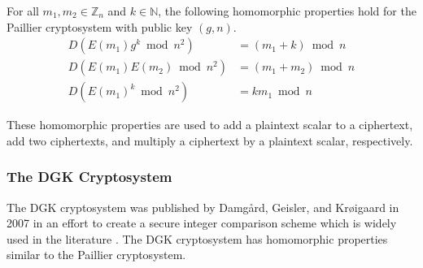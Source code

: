 For all $m_1,m_2 \in \mathbb{Z}_n$ and $k\in \mathbb{N}$, the following homomorphic properties hold for the Paillier cryptosystem with public key $(g,n)$.
\begin{align*}
  D(E(m_1)g^k\bmod n^2) &=(m_1+k)\bmod n\\
  D(E(m_1)E(m_2)\bmod n^2) &=(m_1+m_2)\bmod n\\
  D(E(m_1)^k\bmod n^2) &= km_1\bmod n
\end{align*}

These homomorphic properties are used to add a plaintext scalar to a ciphertext, add two ciphertexts, and multiply a ciphertext by a plaintext scalar, respectively.

\subsubsection{The DGK Cryptosystem}
The DGK cryptosystem was published by Damg{\aa}rd, Geisler, and Kr{\o}igaard in 2007 in an effort to create a secure integer comparison scheme \cite{pieprzyk_efficient_2007, cryptoeprint:2008:321} which is widely used in the literature \cite{veugen_improving_2012}.
The DGK cryptosystem has homomorphic properties similar to the Paillier cryptosystem.





